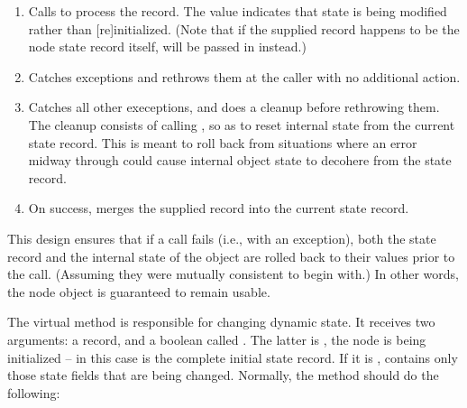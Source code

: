 \documentclass[10pt,twoside]{book}
\begin{document}
\begin{enumerate}

  \item Calls  to process the record. The
     value indicates that state is being modified rather than
    [re]initialized. (Note that if the supplied record happens to be the node
    state record itself,  will be passed in instead.)

  \item Catches  exceptions and rethrows them at
    the caller with no additional action.

  \item Catches all other execeptions, and does a cleanup before rethrowing
    them. The cleanup consists of calling , so
    as to reset internal state from the current state record. This is meant to
    roll back from situations where an error midway through 
    could cause internal object state to decohere from the state record.

  \item On success, merges the supplied record into the current state record.

\end{enumerate}

  This design ensures that if a  call fails (i.e., with an
  exception), both the state record and the internal state of the object are
  rolled back to their values prior to the call. (Assuming they were mutually
  consistent to begin with.) In other words, the node object is guaranteed to
  remain usable.

  The virtual  method is responsible for changing dynamic
  state. It receives two arguments: a  record, and a boolean called
  . The latter is , the node is being initialized --
  in this case  is the complete initial state record. If it is
  ,  contains only those state fields that are being
  changed. Normally, the method should do the following:
\end{document}
